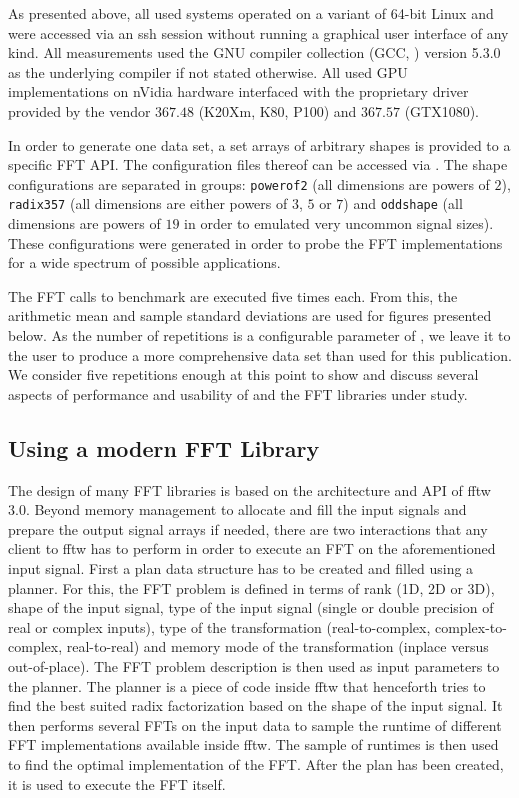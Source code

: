 As presented above, all used systems operated on a variant of 64-bit Linux and were accessed via an ssh session without running a graphical user interface of any kind. All measurements used the GNU compiler collection (GCC, \cite{stallman2001using}) version 5.3.0 as the underlying compiler if not stated otherwise. All used GPU implementations on nVidia hardware interfaced with the proprietary driver provided by the vendor $367.48$ (K20Xm, K80, P100) and $367.57$ (GTX1080). 

In order to generate one data set, a set arrays of arbitrary shapes is provided to a specific FFT API. The configuration files thereof can be accessed via \cite{gearshifft_github}. The shape configurations are separated in groups: \texttt{powerof2} (all dimensions are powers of $2$), \texttt{radix357} (all dimensions are either powers of $3$, $5$ or $7$) and \texttt{oddshape} (all dimensions are powers of $19$ in order to emulated very uncommon signal sizes). These configurations were generated in order to probe the FFT implementations for a wide spectrum of possible applications.  

The FFT calls to benchmark are executed five times each. From this, the arithmetic mean and sample standard deviations are used for figures presented below. As the number of repetitions is a configurable parameter of \gearshifft{}, we leave it to the user to produce a more comprehensive data set than used for this publication. We consider five repetitions enough at this point to show and discuss several aspects of performance and usability of \gearshifft{} and the FFT libraries under study.  

\subsection{Using a modern FFT Library}
\label{ssec:modern_ffts}

The design of many FFT libraries is based on the architecture and API of fftw $3.0$. Beyond memory management to allocate and fill the input signals and prepare the output signal arrays if needed, there are two interactions that any client to fftw has to perform in order to execute an FFT on the aforementioned input signal. First a plan data structure has to be created and filled using a planner. For this, the FFT problem is defined in terms of rank (1D, 2D or 3D), shape of the input signal, type of the input signal (single or double precision of real or complex inputs), type of the transformation (real-to-complex, complex-to-complex, real-to-real) and memory mode of the transformation (inplace versus out-of-place). The FFT problem description is then used as input parameters to the planner. The planner is a piece of code inside fftw that henceforth tries to find the best suited radix factorization based on the shape of the input signal. It then performs several FFTs on the input data to sample the runtime of different FFT implementations available inside fftw. The sample of runtimes is then used to find the optimal implementation of the FFT. After the plan has been created, it is used to execute the FFT itself.

